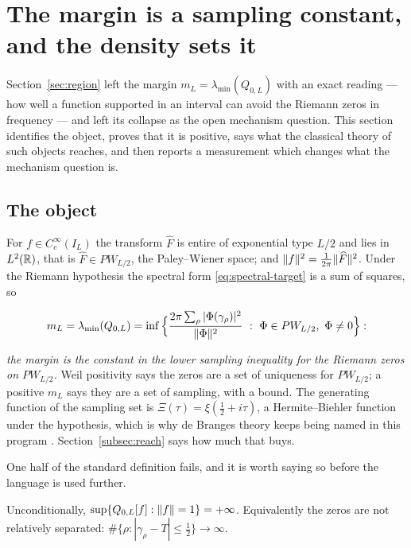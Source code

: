 \section{The margin is a sampling constant, and the density sets it}
\label{sec:sampling}

Section~\ref{sec:region} left the margin
$m_L=\lambda_{\min}(Q_{0,L})$ with an exact reading --- how well a function
supported in an interval can avoid the Riemann zeros in frequency --- and left its
collapse as the open mechanism question. This section identifies the object, proves
that it is positive, says what the classical theory of such objects reaches, and
then reports a measurement which changes what the mechanism question is.

\subsection{The object}

For $f\in C_c^\infty(I_L)$ the transform $\widehat F$ is entire of exponential
type $L/2$ and lies in $L^2(\mathbb R)$, that is $\widehat F\in PW_{L/2}$, the
Paley--Wiener space; and $\lVert f\rVert^2=\frac1{2\pi}\lVert \widehat F\rVert^2$. Under the
Riemann hypothesis the spectral form \eqref{eq:spectral-target} is a sum of
squares, so

\begin{equation}\label{eq:sampling}
 m_L=\lambda_{\min}(Q_{0,L})
 =\inf\Big\{\frac{2\pi\sum_\rho|\Phi(\gamma_\rho)|^2}{\lVert \Phi\rVert^2}
 \ :\ \Phi\in PW_{L/2},\ \Phi\neq0\Big\} :
\end{equation}

\emph{the margin is the constant in the lower sampling inequality for the Riemann
zeros on $PW_{L/2}$.} Weil positivity says the zeros are a set of uniqueness for
$PW_{L/2}$; a positive $m_L$ says they are a set of sampling, with a bound. The
generating function of the sampling set is $\Xi(\tau)=\xi(\frac12+i\tau)$, a
Hermite--Biehler function under the hypothesis, which is why de Branges theory
keeps being named in this program \cite{SuzukiDeBranges}. Section~\ref{subsec:reach}
says how much that buys.

One half of the standard definition fails, and it is worth saying so before the
language is used further.

\begin{proposition}\label{prop:noupper}
Unconditionally, $\sup\{Q_{0,L}[f]:\lVert f\rVert=1\}=+\infty$. Equivalently the zeros
are not relatively separated: $\#\{\rho:|\gamma_\rho-T|\leq\frac12\}\to\infty$.
\end{proposition}

